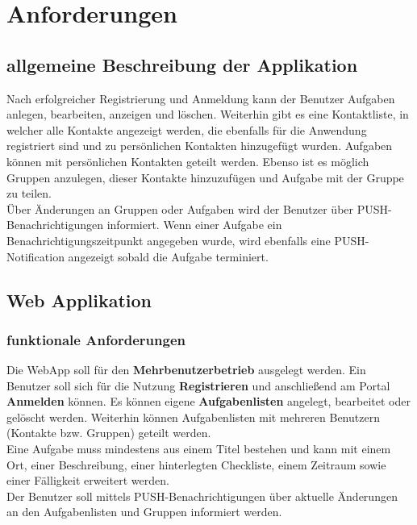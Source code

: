 \section{Anforderungen}

\subsection{allgemeine Beschreibung der Applikation}

Nach erfolgreicher Registrierung und Anmeldung kann der Benutzer Aufgaben anlegen, bearbeiten, anzeigen und löschen. Weiterhin gibt es eine Kontaktliste, in welcher alle Kontakte angezeigt werden, die ebenfalls für die Anwendung registriert sind und zu persönlichen Kontakten hinzugefügt wurden. Aufgaben können mit persönlichen Kontakten geteilt werden. Ebenso ist es möglich Gruppen anzulegen, dieser Kontakte hinzuzufügen und Aufgabe mit der Gruppe zu teilen. \\

Über Änderungen an Gruppen oder Aufgaben wird der Benutzer über PUSH-Benachrichtigungen informiert. Wenn einer Aufgabe ein Benachrichtigungszeitpunkt angegeben wurde, wird ebenfalls eine PUSH-Notification angezeigt sobald die Aufgabe terminiert.


\subsection{Web Applikation}
\subsubsection{funktionale Anforderungen}

Die WebApp soll für den \textbf{Mehrbenutzerbetrieb} ausgelegt werden. Ein Benutzer soll sich für die Nutzung \textbf{Registrieren} und anschließend am Portal \textbf{Anmelden} können. Es können eigene \textbf{Aufgabenlisten} angelegt, bearbeitet oder gelöscht werden. Weiterhin können Aufgabenlisten mit mehreren Benutzern (Kontakte bzw. Gruppen) geteilt werden. \\

Eine Aufgabe muss mindestens aus einem Titel bestehen und kann mit einem Ort, einer Beschreibung, einer hinterlegten Checkliste, einem Zeitraum sowie einer Fälligkeit erweitert werden. \\

Der Benutzer soll mittels PUSH-Benachrichtigungen über aktuelle Änderungen an den Aufgabenlisten und Gruppen informiert werden. 

